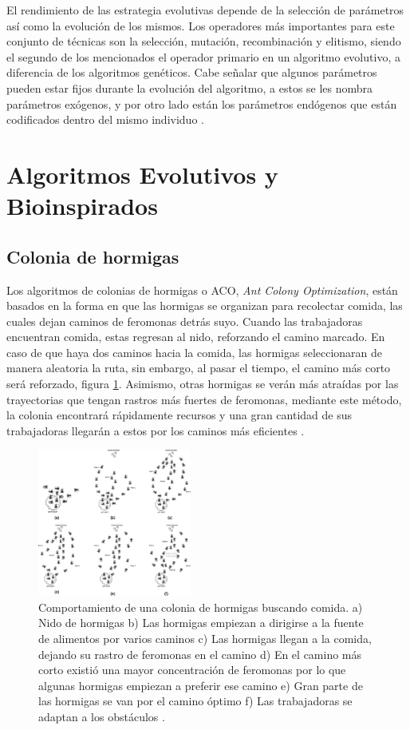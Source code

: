 \documentclass[twocolumn,spanish]{revtex4-1}
\begin{document}
El rendimiento de las estrategia evolutivas depende de la selección de parámetros así como la evolución de los mismos. Los operadores más importantes para este conjunto de técnicas son la selección, mutación, recombinación y elitismo, siendo el segundo de los mencionados el operador primario en un algoritmo evolutivo, a diferencia de los algoritmos genéticos. Cabe señalar que algunos parámetros pueden estar fijos durante la evolución del algoritmo, a estos se les nombra parámetros exógenos, y por otro lado están los parámetros endógenos que están codificados dentro del mismo individuo \cite{Matlab}. 


\section{Algoritmos Evolutivos y Bioinspirados}

\subsection{Colonia de hormigas}

Los algoritmos de colonias de hormigas o ACO, \textit{Ant Colony Optimization}, están basados en la forma en que las hormigas se organizan para recolectar comida, las cuales dejan caminos de feromonas detrás suyo. Cuando las trabajadoras encuentran comida, estas regresan al nido, reforzando el camino marcado. En caso de que haya dos caminos hacia la comida, las hormigas seleccionaran de manera aleatoria la ruta, sin embargo, al pasar el tiempo, el camino más corto será reforzado, figura \ref{fig:hormigasyumyum}. Asimismo, otras hormigas se verán más atraídas por las trayectorias que tengan rastros más fuertes de feromonas, mediante este método, la colonia encontrará rápidamente recursos y una gran cantidad de sus trabajadoras llegarán a estos por los caminos más eficientes  \cite{fan2020review}.

\begin{figure}[h]
    \centering
    \includegraphics[width=0.45\textwidth]{hormigas}
    \caption{Comportamiento de una colonia de hormigas buscando comida. a) Nido de hormigas b) Las hormigas empiezan a dirigirse a la fuente de alimentos por varios caminos c) Las hormigas llegan a la comida, dejando su rastro de feromonas en el camino d) En el camino más corto existió una mayor concentración de feromonas por lo que algunas hormigas empiezan a preferir ese camino e) Gran parte de las hormigas se van por el camino óptimo f) Las trabajadoras se adaptan a los obstáculos \cite{christodoulou2010scheduling}.}
    \label{fig:hormigasyumyum}
\end{figure}
\end{document}
